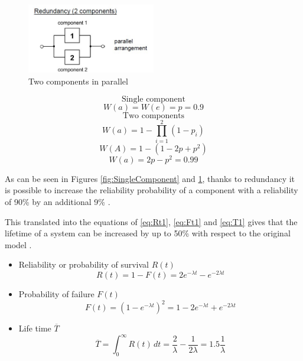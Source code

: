 \documentclass{article}
\begin{document}
\begin{doublespacing}
\begin{figure}[H] 
    \centering
    \includegraphics[width=0.5\textwidth]{Images/TwoComponents.JPG} 
    \caption{Two components in parallel \cite{kaestner:Mark}} 
    \label{fig:TwoComponents} 
\end{figure}

$$\textrm{Single component}$$
$$W(a)=W(e)=p=0.9$$
$$\textrm{Two components}$$
$$W(a)=1-\prod_{i=1}^{2} (1-p_{i})$$
$$W(A)=1-(1-2p+p^2) $$
\begin{equation}
W(a)=2p-p^2=0.99
\end{equation}

\par As can be seen in Figures \ref{fig:SingleComponent} and \ref{fig:TwoComponents}, thanks to redundancy it is possible to increase the reliability probability of a component with a reliability of 90\% by an additional 9\% \cite{kaestner:Mark}.

\par This translated into the equations of \ref{eq:Rt1}, \ref{eq:Ft1} and \ref{eq:T1} gives that the lifetime of a system can be increased by up to 50\% with respect to the original model \cite{kaestner:Mark}.

\begin{itemize}

\item Reliability or probability of survival $ R(t) $
\begin{equation}
R(t) = 1- F(t)=2e^{-\lambda t}-e^{-2 \lambda t}
\label{eq:Rt2}
\end{equation}

\item Probability of failure $F(t)$
\begin{equation}
F(t) = (1 - e^{-\lambda t})^2 = 1-2e^{-\lambda t}+e^{-2 \lambda t}
\label{eq:Ft2}
\end{equation}

\item Life time $\overline{T}$
\begin{equation}
\overline{T} = \int_{0}^{\infty} R(t) \,dt = \frac{2}{\lambda} - \frac{1}{2 \lambda}=1.5 \frac{1}{\lambda}
\label{eq:T2}
\end{equation}


\end{itemize}
\end{doublespacing}
\end{document}
